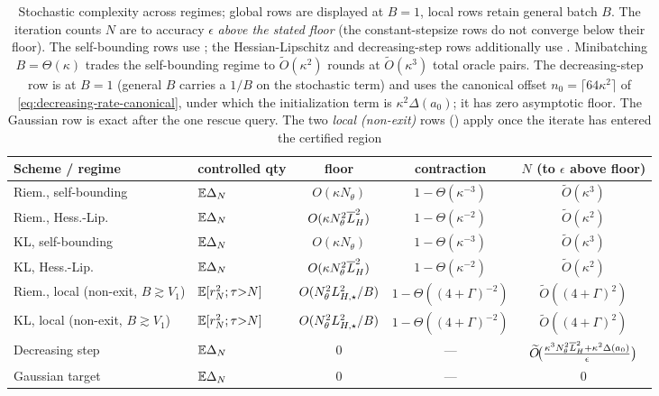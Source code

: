 \begin{table}[t]
\centering
\small
\begin{tabular}{llccc}
\hline
Scheme / regime & controlled qty & floor & contraction & $N$ (to $\epsilon$ above floor) \\
\hline
Riem., self-bounding & $\mathbb{E}\Delta_N$ & $O(\kappa N_\theta)$ & $1-\Theta(\kappa^{-3})$ & $\widetilde O(\kappa^3)$ \\
Riem., Hess.-Lip. & $\mathbb{E}\Delta_N$ & $O(\kappa N_\theta^2\overline{L}_H^2)$ & $1-\Theta(\kappa^{-2})$ & $\widetilde O(\kappa^2)$ \\
KL, self-bounding & $\mathbb{E}\Delta_N$ & $O(\kappa N_\theta)$ & $1-\Theta(\kappa^{-3})$ & $\widetilde O(\kappa^3)$ \\
KL, Hess.-Lip. & $\mathbb{E}\Delta_N$ & $O(\kappa N_\theta^2\overline{L}_H^2)$ & $1-\Theta(\kappa^{-2})$ & $\widetilde O(\kappa^2)$ \\
\hline
Riem., local (non-exit, $B{\gtrsim}V_1$) & $\mathbb{E}[r_N^2;\tau{>}N]$ & $O(N_\theta^2L_{H,\star}^2/B)$ & $1-\Theta((4+\Gamma)^{-2})$ & $\widetilde O((4+\Gamma)^2)$ \\
KL, local (non-exit, $B{\gtrsim}V_1$) & $\mathbb{E}[r_N^2;\tau{>}N]$ & $O(N_\theta^2L_{H,\star}^2/B)$ & $1-\Theta((4+\Gamma)^{-2})$ & $\widetilde O((4+\Gamma)^2)$ \\
\hline
Decreasing step & $\mathbb{E}\Delta_N$ & $0$ & --- & $\widetilde O\!\bigl(\tfrac{\kappa^3N_\theta^2\overline{L}_H^2+\kappa^2\Delta(a_0)}{\epsilon}\bigr)$ \\
Gaussian target & $\mathbb{E}\Delta_N$ & $0$ & --- & $0$ \\
\hline
\end{tabular}
\caption{Stochastic complexity across regimes; global rows are displayed at $B=1$, local rows retain
general batch $B$. The
iteration counts $N$ are to accuracy $\epsilon$ \emph{above the stated floor} (the constant-stepsize
rows do not converge below their floor). The
self-bounding rows use ; the Hessian-Lipschitz and decreasing-step
rows additionally use . Minibatching $B=\Theta(\kappa)$ trades the
self-bounding regime to $\widetilde O(\kappa^2)$ rounds at $\widetilde O(\kappa^3)$ total oracle
pairs. The decreasing-step row is at $B=1$ (general $B$ carries a $1/B$ on the stochastic term) and
uses the canonical offset $n_0=\lceil64\kappa^2\rceil$ of \eqref{eq:decreasing-rate-canonical}, under
which the initialization term is $\kappa^2\Delta(a_0)$; it has zero asymptotic floor. The Gaussian
row is exact after the one rescue query. The two \emph{local (non-exit)} rows
() apply once the iterate has entered the certified region
}
\end{table}
